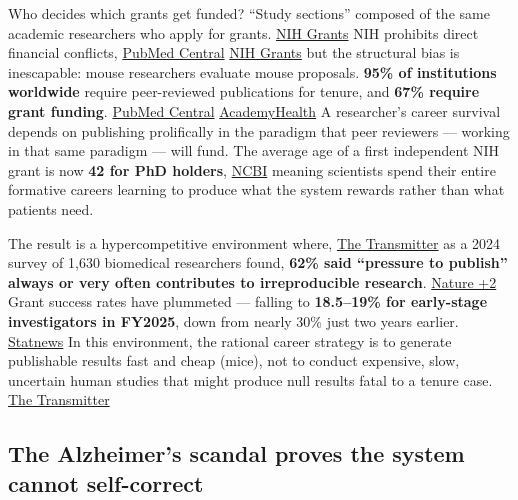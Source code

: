 Who decides which grants get funded? ``Study sections'' composed of the same academic researchers who apply for grants. \href{https://grants.nih.gov/grants-process/review/first-level}{NIH Grants} NIH prohibits direct financial conflicts, \href{https://pmc.ncbi.nlm.nih.gov/articles/PMC5825276/}{PubMed Central} \href{https://grants.nih.gov/grants-process/review/first-level}{NIH Grants} but the structural bias is inescapable: mouse researchers evaluate mouse proposals. \textbf{95\% of institutions worldwide} require peer-reviewed publications for tenure, and \textbf{67\% require grant funding}. \href{https://pmc.ncbi.nlm.nih.gov/articles/PMC7315647/}{PubMed Central} \href{https://academyhealth.org/sites/default/files/publication/\%5Bfield_date:custom:Y\%5D-\%5Bfield_date:custom:m\%5D/academicincentivesresearchimpact_feb2021.pdf}{AcademyHealth} A researcher's career survival depends on publishing prolifically in the paradigm that peer reviewers --- working in that same paradigm --- will fund. The average age of a first independent NIH grant is now \textbf{42 for PhD holders}, \href{https://www.ncbi.nlm.nih.gov/books/NBK22694/}{NCBI} meaning scientists spend their entire formative careers learning to produce what the system rewards rather than what patients need.

The result is a hypercompetitive environment where, \href{https://www.thetransmitter.org/spectrum/book-review-rigor-mortis-reveals-rampant-sloppiness-science/}{The Transmitter} as a 2024 survey of 1,630 biomedical researchers found, \textbf{62\% said ``pressure to publish'' always or very often contributes to irreproducible research}. \href{https://www.nature.com/articles/d41586-024-04253-w}{Nature +2} Grant success rates have plummeted --- falling to \textbf{18.5--19\% for early-stage investigators in FY2025}, down from nearly 30\% just two years earlier. \href{https://www.statnews.com/2025/12/18/nih-early-career-researchers-grant-success-rate-falls/}{Statnews} In this environment, the rational career strategy is to generate publishable results fast and cheap (mice), not to conduct expensive, slow, uncertain human studies that might produce null results fatal to a tenure case. \href{https://www.thetransmitter.org/spectrum/book-review-rigor-mortis-reveals-rampant-sloppiness-science/}{The Transmitter}

\subsection{The Alzheimer's scandal proves the system cannot self-correct}\label{19_200_billion-the-alzheimers-scandal-proves-the-system-cannot-self-correct}

